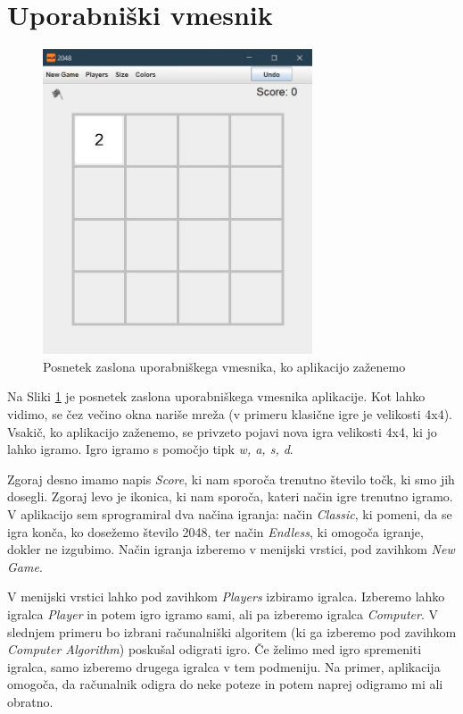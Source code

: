 \documentclass{article}
\begin{document}
\section{Uporabniški vmesnik}

\begin{figure}[ht!]
\centering
\includegraphics[width=8cm]{ui.jpg}
\caption{Posnetek zaslona uporabniškega vmesnika, ko aplikacijo zaženemo}
\label{ui}
\end{figure}

Na Sliki \ref{ui} je posnetek zaslona uporabniškega vmesnika aplikacije. Kot lahko vidimo, se čez večino okna nariše mreža (v primeru klasične igre je velikosti 4x4). Vsakič, ko aplikacijo zaženemo, se privzeto pojavi nova igra velikosti 4x4, ki jo lahko igramo. Igro igramo s pomočjo tipk \textit{w, a, s, d}. 

Zgoraj desno imamo napis \emph{Score}, ki nam sporoča trenutno število točk, ki smo jih dosegli. Zgoraj levo je ikonica, ki nam sporoča, kateri način igre trenutno igramo. V aplikacijo sem sprogramiral dva načina igranja: način \emph{Classic}, ki pomeni, da se igra konča, ko dosežemo število 2048, ter način \emph{Endless}, ki omogoča igranje, dokler ne izgubimo. Način igranja izberemo v menijski vrstici, pod zavihkom \emph{New Game}.

V menijski vrstici lahko pod zavihkom \emph{Players} izbiramo igralca. Izberemo lahko igralca \emph{Player} in potem igro igramo sami, ali pa izberemo igralca \emph{Computer}. V slednjem primeru bo izbrani računalniški algoritem (ki ga izberemo pod zavihkom \emph{Computer Algorithm}) poskušal odigrati igro. Če želimo med igro spremeniti igralca, samo izberemo drugega igralca v tem podmeniju. Na primer, aplikacija omogoča, da računalnik odigra do neke poteze in potem naprej odigramo mi ali obratno.
\end{document}
